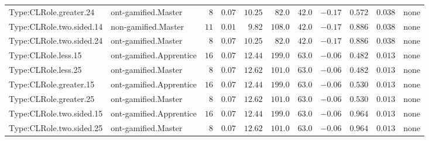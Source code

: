 \documentclass[6pt,a4paper]{article}
\begin{document}
{\begin{longtable}{llrrrrrrrrl}
Type:CLRole.greater.24&ont-gamified.Master&$ 8$&$ 0.07$&$10.25$&$ 82.0$&$ 42.0$&$-0.17$&$0.572$&$0.038$&none\tabularnewline
Type:CLRole.two.sided.14&non-gamified.Master&$11$&$ 0.01$&$ 9.82$&$108.0$&$ 42.0$&$-0.17$&$0.886$&$0.038$&none\tabularnewline
Type:CLRole.two.sided.24&ont-gamified.Master&$ 8$&$ 0.07$&$10.25$&$ 82.0$&$ 42.0$&$-0.17$&$0.886$&$0.038$&none\tabularnewline
Type:CLRole.less.15&ont-gamified.Apprentice&$16$&$ 0.07$&$12.44$&$199.0$&$ 63.0$&$-0.06$&$0.482$&$0.013$&none\tabularnewline
Type:CLRole.less.25&ont-gamified.Master&$ 8$&$ 0.07$&$12.62$&$101.0$&$ 63.0$&$-0.06$&$0.482$&$0.013$&none\tabularnewline
Type:CLRole.greater.15&ont-gamified.Apprentice&$16$&$ 0.07$&$12.44$&$199.0$&$ 63.0$&$-0.06$&$0.530$&$0.013$&none\tabularnewline
Type:CLRole.greater.25&ont-gamified.Master&$ 8$&$ 0.07$&$12.62$&$101.0$&$ 63.0$&$-0.06$&$0.530$&$0.013$&none\tabularnewline
\newpage
Type:CLRole.two.sided.15&ont-gamified.Apprentice&$16$&$ 0.07$&$12.44$&$199.0$&$ 63.0$&$-0.06$&$0.964$&$0.013$&none\tabularnewline
Type:CLRole.two.sided.25&ont-gamified.Master&$ 8$&$ 0.07$&$12.62$&$101.0$&$ 63.0$&$-0.06$&$0.964$&$0.013$&none\tabularnewline
\hline
\end{longtable}}
\end{document}
